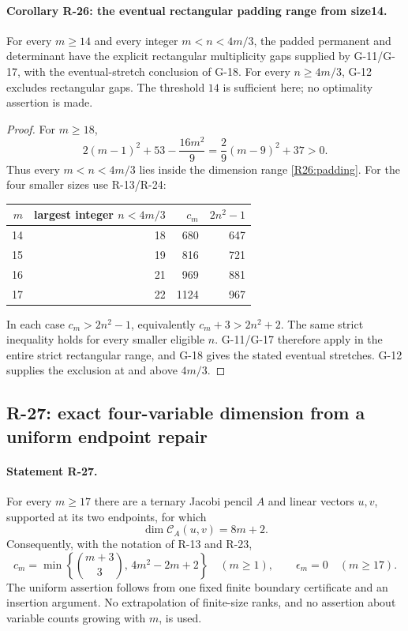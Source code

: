 \paragraph{Corollary R-26: the eventual rectangular padding range from size14.}
For every $m\geq14$ and every integer $m<n<4m/3$, the padded
permanent and determinant have the explicit rectangular
multiplicity gaps supplied by G-11/G-17, with the eventual-stretch
conclusion of G-18. For every $n\geq4m/3$, G-12 excludes
rectangular gaps. The threshold $14$ is sufficient here; no
optimality assertion is made.

\begin{proof}
For $m\geq18$,
\[
 2(m-1)^2+53-\frac{16m^2}{9}
       =\frac29(m-9)^2+37>0.
\]
Thus every $m<n<4m/3$ lies inside the dimension range
\eqref{R26:padding}. For the four smaller sizes use R-13/R-24:
\begin{center}
\begin{tabular}{rrrr}
$m$&largest integer $n<4m/3$&$c_m$&$2n^2-1$\\ \hline
14&18&680&647\\
15&19&816&721\\
16&21&969&881\\
17&22&1124&967
\end{tabular}
\end{center}
In each case $c_m>2n^2-1$, equivalently
$c_m+3>2n^2+2$. The same strict inequality holds for every
smaller eligible $n$. G-11/G-17 therefore apply in the entire
strict rectangular range, and G-18 gives the stated eventual
stretches. G-12 supplies the exclusion at and above $4m/3$.
\end{proof}


\subsection{R-27: exact four-variable dimension from a uniform endpoint repair}

\paragraph{Statement R-27.}
For every $m\geq17$ there are a ternary Jacobi pencil $A$ and
linear vectors $u,v$, supported at its two endpoints, for which
\begin{equation}\label{R27:criterion}
 \dim\mathcal C_A(u,v)=8m+2.
\end{equation}
Consequently, with the notation of R-13 and R-23,
\begin{equation}\label{R27:dimension}
 c_m=\min\left\{\binom{m+3}{3},\,4m^2-2m+2\right\}
 \quad(m\geq1),
 \qquad \epsilon_m=0\quad(m\geq17).
\end{equation}
The uniform assertion follows from one fixed finite boundary
certificate and an insertion argument. No extrapolation of
finite-size ranks, and no assertion about variable counts growing
with $m$, is used.

